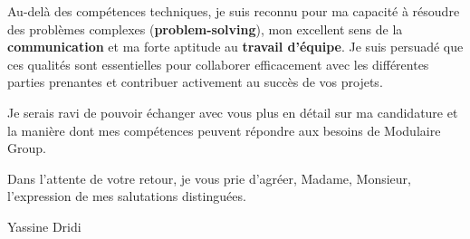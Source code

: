 \documentclass[11pt, a4paper]{article}
\begin{document}
\vspace{4mm}

\noindent
Au-delà des compétences techniques, je suis reconnu pour ma capacité à résoudre des problèmes complexes (\textbf{problem-solving}), mon excellent sens de la \textbf{communication} et ma forte aptitude au \textbf{travail d'équipe}. Je suis persuadé que ces qualités sont essentielles pour collaborer efficacement avec les différentes parties prenantes et contribuer activement au succès de vos projets.

\vspace{4mm}

\noindent
Je serais ravi de pouvoir échanger avec vous plus en détail sur ma candidature et la manière dont mes compétences peuvent répondre aux besoins de Modulaire Group.

\vspace{8mm}

\noindent
Dans l'attente de votre retour, je vous prie d'agréer, Madame, Monsieur, l'expression de mes salutations distinguées.

\vspace{1.5cm}

\begin{flushright}
    Yassine Dridi
\end{flushright}
\end{document}

